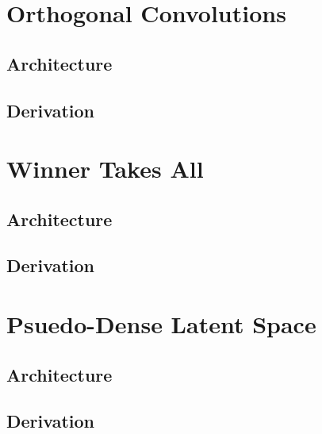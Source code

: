 \section{Orthogonal Convolutions}
\lipsum[2]
\subsection{Architecture}
\subsection{Derivation}

%
%
%
%
%
\section{Winner Takes All}
\lipsum[2]
\subsection{Architecture}
\subsection{Derivation}

%
%
%
%
%
\section{Psuedo-Dense Latent Space}
\lipsum[2]
\subsection{Architecture}
\subsection{Derivation}
